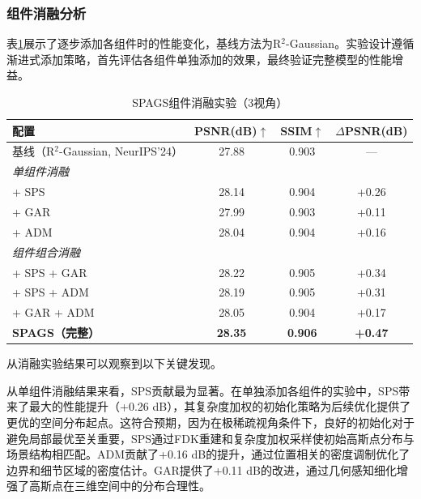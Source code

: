 \subsubsection{组件消融分析}

表\ref{tab:spags_ablation}展示了逐步添加各组件时的性能变化，基线方法为R$^2$-Gaussian。实验设计遵循渐进式添加策略，首先评估各组件单独添加的效果，最终验证完整模型的性能增益。

\begin{table}[htbp]
    \centering
    \caption{SPAGS组件消融实验（3视角）}
    \label{tab:spags_ablation}
    \begin{tabular*}{0.72\textwidth}{@{\extracolsep{\fill}}lccc@{}}
        \toprule
        配置 & PSNR(dB)$\uparrow$ & SSIM$\uparrow$ & $\Delta$PSNR(dB) \\
        \midrule
        基线（R$^2$-Gaussian, NeurIPS'24） & 27.88 & 0.903 & — \\
        \midrule
        \multicolumn{4}{l}{\textit{单组件消融}} \\
        \quad + SPS & 28.14 & 0.904 & +0.26 \\
        \quad + GAR & 27.99 & 0.903 & +0.11 \\
        \quad + ADM & 28.04 & 0.904 & +0.16 \\
        \midrule
        \multicolumn{4}{l}{\textit{组件组合消融}} \\
        \quad + SPS + GAR & 28.22 & 0.905 & +0.34 \\
        \quad + SPS + ADM & 28.19 & 0.905 & +0.31 \\
        \quad + GAR + ADM & 28.05 & 0.904 & +0.17 \\
        \midrule
        \textbf{SPAGS（完整）} & \textbf{28.35} & \textbf{0.906} & \textbf{+0.47} \\
        \bottomrule
    \end{tabular*}
\end{table}

从消融实验结果可以观察到以下关键发现。

从单组件消融结果来看，SPS贡献最为显著。在单独添加各组件的实验中，SPS带来了最大的性能提升（+0.26 dB），其复杂度加权的初始化策略为后续优化提供了更优的空间分布起点。这符合预期，因为在极稀疏视角条件下，良好的初始化对于避免局部最优至关重要，SPS通过FDK重建和复杂度加权采样使初始高斯点分布与场景结构相匹配。ADM贡献了+0.16 dB的提升，通过位置相关的密度调制优化了边界和细节区域的密度估计。GAR提供了+0.11 dB的改进，通过几何感知细化增强了高斯点在三维空间中的分布合理性。

